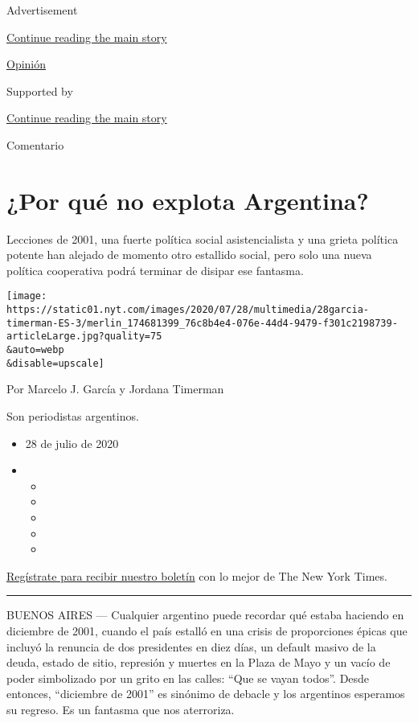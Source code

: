 Advertisement

\protect\hyperlink{after-top}{Continue reading the main story}

\href{/es/section/opinion}{Opinión}

Supported by

\protect\hyperlink{after-sponsor}{Continue reading the main story}

Comentario

\hypertarget{por-quuxe9-no-explota-argentina}{%
\section{¿Por qué no explota
Argentina?}\label{por-quuxe9-no-explota-argentina}}

Lecciones de 2001, una fuerte política social asistencialista y una
grieta política potente han alejado de momento otro estallido social,
pero solo una nueva política cooperativa podrá terminar de disipar ese
fantasma.

\texttt{[image: https://static01.nyt.com/images/2020/07/28/multimedia/28garcia-timerman-ES-3/merlin\_174681399\_76c8b4e4-076e-44d4-9479-f301c2198739-articleLarge.jpg?quality=75\\\&auto=webp\\\&disable=upscale]}

Por Marcelo J. García y Jordana Timerman

Son periodistas argentinos.

\begin{itemize}
\item
  28 de julio de 2020
\item
  \begin{itemize}
  \item
  \item
  \item
  \item
  \item
  \end{itemize}
\end{itemize}

\href{https://www.nytimes.com/newsletters/el-times}{Regístrate para
recibir nuestro boletín} con lo mejor de The New York Times.

\begin{center}\rule{0.5\linewidth}{\linethickness}\end{center}

BUENOS AIRES --- Cualquier argentino puede recordar qué estaba haciendo
en diciembre de 2001, cuando el país estalló en una crisis de
proporciones épicas que incluyó la renuncia de dos presidentes en diez
días, un default masivo de la deuda, estado de sitio, represión y
muertes en la Plaza de Mayo y un vacío de poder simbolizado por un grito
en las calles: ``Que se vayan todos''. Desde entonces, ``diciembre de
2001'' es sinónimo de debacle y los argentinos esperamos su regreso. Es
un fantasma que nos aterroriza.


